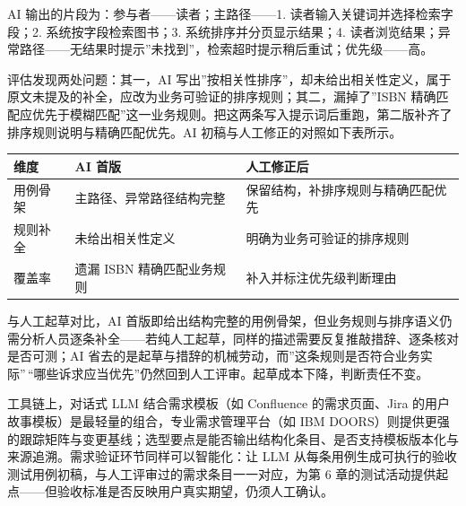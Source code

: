 \documentclass[12pt,a4paper,twoside,openany]{ctexbook}
\numberwithin{figure}{chapter}
\numberwithin{table}{chapter}
\newcounter{none}
\begin{document}
AI 输出的片段为：参与者------读者；主路径------1.
读者输入关键词并选择检索字段；2. 系统按字段检索图书；3.
系统排序并分页显示结果；4.
读者浏览结果；异常路径------无结果时提示''未找到''，检索超时提示稍后重试；优先级------高。

评估发现两处问题：其一，AI
写出''按相关性排序''，却未给出相关性定义，属于原文未提及的补全，应改为业务可验证的排序规则；其二，漏掉了''ISBN
精确匹配应优先于模糊匹配''这一业务规则。把这两条写入提示词后重跑，第二版补齐了排序规则说明与精确匹配优先。AI
初稿与人工修正的对照如下表所示。

{\def\LTcaptype{none} %
\begin{longtable}[]{@{}
  >{\raggedright\arraybackslash}p{}
  >{\raggedright\arraybackslash}p{}
  >{\raggedright\arraybackslash}p{}@{}}
\toprule\noalign{}
\begin{minipage}[b]{\linewidth}\raggedright
维度
\end{minipage} & \begin{minipage}[b]{\linewidth}\raggedright
AI 首版
\end{minipage} & \begin{minipage}[b]{\linewidth}\raggedright
人工修正后
\end{minipage} \\
\midrule\noalign{}
\endhead
\bottomrule\noalign{}
\endlastfoot
用例骨架 & 主路径、异常路径结构完整 &
保留结构，补排序规则与精确匹配优先 \\
规则补全 & 未给出相关性定义 & 明确为业务可验证的排序规则 \\
覆盖率 & 遗漏 ISBN 精确匹配业务规则 & 补入并标注优先级判断理由 \\
\end{longtable}
}

与人工起草对比，AI
首版即给出结构完整的用例骨架，但业务规则与排序语义仍需分析人员逐条补全------若纯人工起草，同样的描述需要反复推敲措辞、逐条核对是否可测；AI
省去的是起草与措辞的机械劳动，而''这条规则是否符合业务实际''\,``哪些诉求应当优先''仍然回到人工评审。起草成本下降，判断责任不变。

工具链上，对话式 LLM 结合需求模板（如 Confluence 的需求页面、Jira
的用户故事模板）是最轻量的组合，专业需求管理平台（如 IBM
DOORS）则提供更强的跟踪矩阵与变更基线；选型要点是能否输出结构化条目、是否支持模板版本化与来源追溯。需求验证环节同样可以智能化：让
LLM
从每条用例生成可执行的验收测试用例初稿，与人工评审过的需求条目一一对应，为第
6
章的测试活动提供起点------但验收标准是否反映用户真实期望，仍须人工确认。
\end{document}

